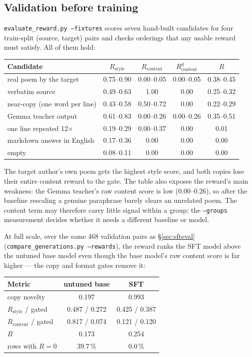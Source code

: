 \documentclass[11pt]{article}
\begin{document}
\subsection{Validation before training}

\texttt{evaluate\_reward.py --fixtures} scores seven hand-built candidates for
four train-split (source, target) pairs and checks orderings that any usable
reward must satisfy. All of them hold:

\begin{center}
\begin{tabular}{lcccc}
\toprule
Candidate & $R_{\mathrm{style}}$ & $R_{\mathrm{content}}$ & $R_{\mathrm{content}}^{g}$ & $R$ \\
\midrule
real poem by the target & 0.75--0.90 & 0.00--0.05 & 0.00--0.05 & 0.38--0.45 \\
verbatim source & 0.49--0.63 & 1.00 & 0.00 & 0.25--0.32 \\
near-copy (one word per line) & 0.43--0.58 & 0.50--0.72 & 0.00 & 0.22--0.29 \\
Gemma teacher output & 0.61--0.83 & 0.00--0.26 & 0.00--0.26 & 0.35--0.51 \\
one line repeated 12$\times$ & 0.19--0.29 & 0.00--0.37 & 0.00 & 0.01 \\
markdown answer in English & 0.17--0.36 & 0.00 & 0.00 & 0.00 \\
empty & 0.08--0.11 & 0.00 & 0.00 & 0.00 \\
\bottomrule
\end{tabular}
\end{center}

The target author's own poem gets the highest style score, and both copies
lose their entire content reward to the gate. The table also exposes the
reward's main weakness: the Gemma teacher's raw content score is low
(0.00--0.26), so after the baseline rescaling a genuine paraphrase barely
clears an unrelated poem. The content term may therefore carry little signal
within a group; the \texttt{--groups} measurement decides whether it needs a
different baseline or model.

At full scale, over the same 468 validation pairs as \S\ref{sec:sfteval}
(\texttt{compare\_generations.py --rewards}), the reward ranks the SFT model
above the untuned base model even though the base model's raw content score
is far higher --- the copy and format gates remove it:

\begin{center}
\begin{tabular}{lcc}
\toprule
Metric & untuned base & SFT \\
\midrule
copy novelty & 0.197 & 0.993 \\
$R_{\mathrm{style}}$ / gated & 0.487 / 0.272 & 0.425 / 0.387 \\
$R_{\mathrm{content}}$ / gated & 0.817 / 0.074 & 0.121 / 0.120 \\
$R$ & 0.173 & 0.254 \\
rows with $R=0$ & 39.7\,\% & 0.0\,\% \\
\bottomrule
\end{tabular}
\end{center}
\end{document}
